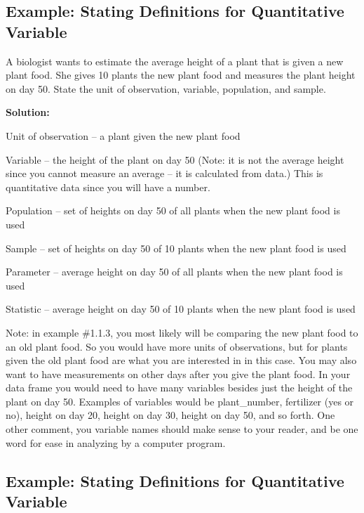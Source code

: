 \documentclass[
]{book}
\begin{document}
\hypertarget{example-stating-definitions-for-quantitative-variable}{%
\subsection{Example: Stating Definitions for Quantitative Variable}\label{example-stating-definitions-for-quantitative-variable}}

A biologist wants to estimate the average height of a plant that is given a new plant food. She gives 10 plants the new plant food and measures the plant height on day 50. State the unit of observation, variable, population, and sample.

\textbf{Solution:}

Unit of observation -- a plant given the new plant food

Variable -- the height of the plant on day 50 (Note: it is not the average height since you cannot measure an average -- it is calculated from data.) This is quantitative data since you will have a number.

Population -- set of heights on day 50 of all plants when the new plant food is used

Sample -- set of heights on day 50 of 10 plants when the new plant food is used

Parameter -- average height on day 50 of all plants when the new plant food is used

Statistic -- average height on day 50 of 10 plants when the new plant food is used

Note: in example \#1.1.3, you most likely will be comparing the new plant food to an old plant food. So you would have more units of observations, but for plants given the old plant food are what you are interested in in this case. You may also want to have measurements on other days after you give the plant food. In your data frame you would need to have many variables besides just the height of the plant on day 50. Examples of variables would be plant\_number, fertilizer (yes or no), height on day 20, height on day 30, height on day 50, and so forth. One other comment, you variable names should make sense to your reader, and be one word for ease in analyzing by a computer program.

\hypertarget{example-stating-definitions-for-quantitative-variable-1}{%
\subsection{Example: Stating Definitions for Quantitative Variable}\label{example-stating-definitions-for-quantitative-variable-1}}
\end{document}

